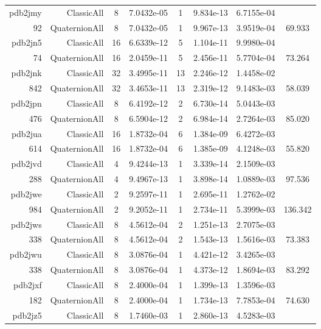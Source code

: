 \begin{xltabular}{\textwidth}{r|rcS[table-format=1.4e+2]cS[table-format=1.3e+2]S[table-format=1.4e+2]S[table-format=-1.3]}
pdb2jmy & ClassicAll & 8 & 7.0432e-05 & 1 & 9.834e-13 & 6.7155e-04 & \\
92 & QuaternionAll & 8 & 7.0432e-05 & 1 & 9.967e-13 & 3.9519e-04 & 69.933\\  \addlinespace
pdb2jn5 & ClassicAll & 16 & 6.6339e-12 & 5 & 1.104e-11 & 9.9980e-04 & \\
74 & QuaternionAll & 16 & 2.0459e-11 & 5 & 2.456e-11 & 5.7704e-04 & 73.264\\  \addlinespace
pdb2jnk & ClassicAll & 32 & 3.4995e-11 & 13 & 2.246e-12 & 1.4458e-02 & \\
842 & QuaternionAll & 32 & 3.4653e-11 & 13 & 2.319e-12 & 9.1483e-03 & 58.039\\  \addlinespace
pdb2jpn & ClassicAll & 8 & 6.4192e-12 & 2 & 6.730e-14 & 5.0443e-03 & \\
476 & QuaternionAll & 8 & 6.5904e-12 & 2 & 6.984e-14 & 2.7264e-03 & 85.020\\  \addlinespace
pdb2jua & ClassicAll & 16 & 1.8732e-04 & 6 & 1.384e-09 & 6.4272e-03 & \\
614 & QuaternionAll & 16 & 1.8732e-04 & 6 & 1.385e-09 & 4.1248e-03 & 55.820\\  \addlinespace
pdb2jvd & ClassicAll & 4 & 9.4244e-13 & 1 & 3.339e-14 & 2.1509e-03 & \\
288 & QuaternionAll & 4 & 9.4967e-13 & 1 & 3.898e-14 & 1.0889e-03 & 97.536\\  \addlinespace
pdb2jwe & ClassicAll & 2 & 9.2597e-11 & 1 & 2.695e-11 & 1.2762e-02 & \\
984 & QuaternionAll & 2 & 9.2052e-11 & 1 & 2.734e-11 & 5.3999e-03 & 136.342\\  \addlinespace
pdb2jws & ClassicAll & 8 & 4.5612e-04 & 2 & 1.251e-13 & 2.7075e-03 & \\
338 & QuaternionAll & 8 & 4.5612e-04 & 2 & 1.543e-13 & 1.5616e-03 & 73.383\\  \addlinespace
pdb2jwu & ClassicAll & 8 & 3.0876e-04 & 1 & 4.421e-12 & 3.4265e-03 & \\
338 & QuaternionAll & 8 & 3.0876e-04 & 1 & 4.373e-12 & 1.8694e-03 & 83.292\\  \addlinespace
pdb2jxf & ClassicAll & 8 & 2.4000e-04 & 1 & 1.399e-13 & 1.3596e-03 & \\
182 & QuaternionAll & 8 & 2.4000e-04 & 1 & 1.734e-13 & 7.7853e-04 & 74.630\\  \addlinespace
pdb2jz5 & ClassicAll & 8 & 1.7460e-03 & 1 & 2.860e-13 & 4.5283e-03 & \\

\end{xltabular}
